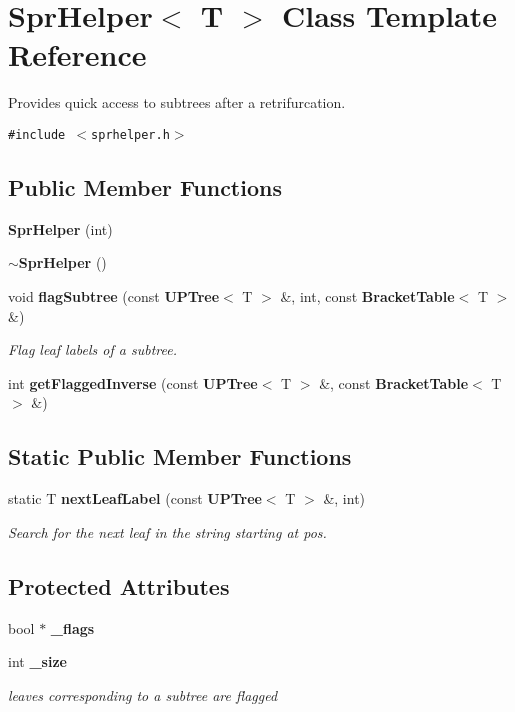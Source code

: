 \section{Spr\-Helper$<$ T $>$ Class Template Reference}
\label{classSprHelper}
Provides quick access to subtrees after a retrifurcation.  


{\tt \#include $<$sprhelper.h$>$}

\subsection*{Public Member Functions}
\begin{CompactItemize}
\item 
{\bf Spr\-Helper} (int)
\item 
{\bf $\sim$Spr\-Helper} ()
\item 
void {\bf flag\-Subtree} (const {\bf UPTree}$<$ T $>$ \&, int, const {\bf Bracket\-Table}$<$ T $>$ \&)
\begin{CompactList}\small\item\em Flag leaf labels of a subtree. \item\end{CompactList}\item 
int {\bf get\-Flagged\-Inverse} (const {\bf UPTree}$<$ T $>$ \&, const {\bf Bracket\-Table}$<$ T $>$ \&)
\end{CompactItemize}
\subsection*{Static Public Member Functions}
\begin{CompactItemize}
\item 
static T {\bf next\-Leaf\-Label} (const {\bf UPTree}$<$ T $>$ \&, int)
\begin{CompactList}\small\item\em Search for the next leaf in the string starting at pos. \item\end{CompactList}\end{CompactItemize}
\subsection*{Protected Attributes}
\begin{CompactItemize}
\item 
bool $\ast$ {\bf \_\-flags}
\item 
int {\bf \_\-size}
\begin{CompactList}\small\item\em leaves corresponding to a subtree are flagged \item\end{CompactList}\end{CompactItemize}
